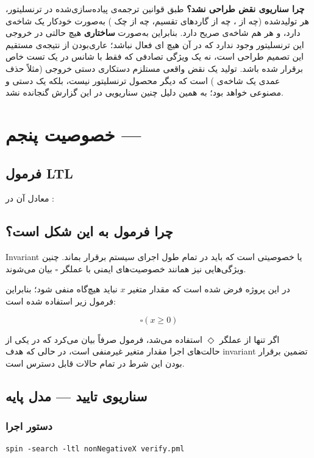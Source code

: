 \documentclass[12pt]{report}
\newcommand{\ltlbox}[1]{%
	\begin{center}
		\color{white}
		\setlength{\fboxsep}{8pt}
		\fcolorbox{white}{CustomBackground}{
			\parbox{0.9\linewidth}{\centering $#1$}
		}
	\end{center}
}
\begin{document}
	\textbf{چرا سناریوی نقض طراحی نشد؟} طبق قوانین ترجمه‌ی پیاده‌سازی‌شده در ترنسلیتور، هر  تولیدشده (چه از ، چه از گاردهای تقسیم، چه از چک ) به‌صورت خودکار یک شاخه‌ی  دارد، و هر  هم شاخه‌ی  صریح دارد. بنابراین به‌صورت \textbf{ساختاری} هیچ حالتی در خروجی این ترنسلیتور وجود ندارد که در آن هیچ ای فعال نباشد؛ عاری‌بودن از  نتیجه‌ی مستقیم این تصمیم طراحی است، نه یک ویژگی تصادفی که فقط با شانس در یک تست خاص برقرار شده باشد. تولید یک نقض واقعی مستلزم دستکاری دستی خروجی  (مثلاً حذف عمدی یک شاخه‌ی ) است که دیگر محصول ترنسلیتور نیست، بلکه یک  دستی و مصنوعی خواهد بود؛ به همین دلیل چنین سناریویی در این گزارش گنجانده نشد.
	
	\section{خصوصیت پنجم --- }
	
	\subsection{فرمول LTL}
	\ltlbox{\square\,(x \geq 0)}
	معادل آن در : 
	
	\subsection{چرا فرمول به این شکل است؟}
	
	Invariant یا خصوصیتی است که باید در تمام طول اجرای سیستم برقرار بماند. چنین ویژگی‌هایی نیز همانند خصوصیت‌های ایمنی با عملگر $\square$ بیان می‌شوند.
	
	در این پروژه فرض شده است که مقدار متغیر $x$ نباید هیچ‌گاه منفی شود؛ بنابراین فرمول زیر استفاده شده است:
	
	\[
	\square(x \ge 0)
	\]
	
	اگر تنها از عملگر $\Diamond$ استفاده می‌شد، فرمول صرفاً بیان می‌کرد که در یکی از حالت‌های اجرا مقدار متغیر غیرمنفی است، در حالی که هدف invariant تضمین برقرار بودن این شرط در تمام حالات قابل دسترس است.
	\subsection{سناریوی تایید --- مدل پایه}
	
	\subsubsection{دستور اجرا}
	\begin{latin}
		\begin{lstlisting}[style=codestyle]
			spin -search -ltl nonNegativeX verify.pml
		\end{lstlisting}
	\end{latin}
	
\end{document}

